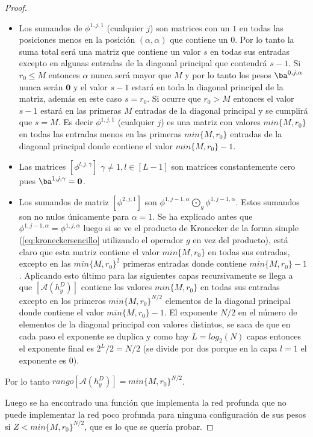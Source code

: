 \begin{proof}
\begin{itemize}
\item Los sumandos de $\phi^{1,j,1}$ (cualquier $j$) son matrices con un $1$ en todas las posiciones menos en la posición $(\alpha,\alpha)$ que contiene un $0$. Por lo tanto la suma total será una matriz que contiene un valor $s$ en todas sus entradas excepto en algunas entradas de la diagonal principal que contendrá $s-1$. Si $r_0 \leq M$ entonces $\alpha$ nunca será mayor que $M$ y por lo tanto los pesos $\ba^{0,j,\alpha}$ nunca serán $\mathbf{0}$ y el valor $s-1$ estará en toda la diagonal principal de la matriz, además en este caso $s=r_0$. Si ocurre que $r_0 > M$ entonces el valor $s-1$ estará en las primeras $M$ entradas de la diagonal principal y se cumplirá que $s = M$. Es decir $\phi^{1,j,1}$ (cualquier $j$) es una  matriz con valores $\textit{min}\{M,r_0\}$ en todas las entradas menos en las primeras $\textit{min}\{M,r_0\}$ entradas de la diagonal principal donde contiene el valor $\textit{min}\{M,r_0\}-1$.

\item Las matrices $[\phi^{l,j,\gamma}]$ $\gamma \neq 1, l\in [L-1]$ son matrices constantemente cero pues $\ba^{1,j,\gamma} = \mathbf{0}$.

\item Los sumandos de matriz $[\phi^{2,j,1}]$ son $\phi^{1,j-1,\alpha} \bigodot_g \phi^{1,j-1,\alpha}$. Estos sumandos son no nulos únicamente para $\alpha=1$. Se ha explicado antes que $\phi^{1,j-1,\alpha} = \phi^{1,j,\alpha}$ luego si se ve el producto de Kronecker de la forma simple (\eqref{eq:kroneckersencillo} utilizando el operador $g$ en vez del producto), está claro que esta matriz contiene el valor $\textit{min}\{M,r_0\}$ en todas sus entradas, excepto en las $\textit{min}\{M,r_0\}^2$ primeras entradas donde contiene $\textit{min}\{M,r_0\}-1$. Aplicando esto último para las siguientes capas recursivamente se llega a que $[\mathcal{A}(h^D_y)]$ contiene los valores $\textit{min}\{M,r_0\}$ en todas sus entradas excepto en los primeros $\textit{min}\{M,r_0\}^{N/2}$ elementos de la diagonal principal donde contiene el valor $\textit{min}\{M,r_0\}-1$. El exponente $N/2$ en el número de elementos de la diagonal principal con valores distintos, se saca de que en cada paso el exponente se duplica y como hay $L = log_2(N)$ capas entonces el exponente final es $2^L/2 = N/2$ (se divide por dos porque en la capa $l=1$ el exponente es $0$).
\end{itemize}

Por lo tanto $\textit{rango}[\mathcal{A}(h^D_y)] = \textit{min}\{M,r_0\}^{N/2}$.

Luego se ha encontrado una función que implementa la red profunda que no puede implementar la red poco profunda para ninguna configuración de sus pesos si $Z < \textit{min}\{M,r_0\}^{N/2}$, que es lo que se quería probar.
\end{proof}

